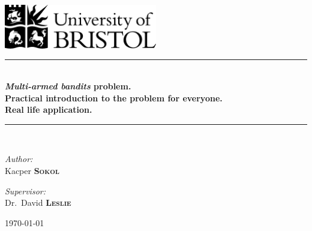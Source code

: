 \documentclass[12pt, a4paper, pdflatex]{report}
\newcommand{\HRule}{\rule{\linewidth}{0.5mm}}
\begin{document}
\begin{titlepage}
\begin{center}
\includegraphics[width=0.5\textwidth]{graphics/UOB-logo.png}~\\[4cm] %



\HRule \\[0.4cm]
{ \huge \bfseries \emph{Multi-armed bandits} problem.\\
	Practical introduction to the problem for everyone.\\
 	Real life application. \\[0.4cm] }
\HRule \\[1.5cm]

\begin{minipage}{0.4\textwidth}
\begin{flushleft} \large
\emph{Author:}\\
Kacper \textsc{\textbf{Sokol}}
\end{flushleft}
\end{minipage}
\begin{minipage}{0.4\textwidth}
\begin{flushright} \large
\emph{Supervisor:} \\
Dr.~David \textsc{\textbf{Leslie}}
\end{flushright}
\end{minipage}

\vfill

{\large \today}
\end{center}
\end{titlepage}

\end{document}
